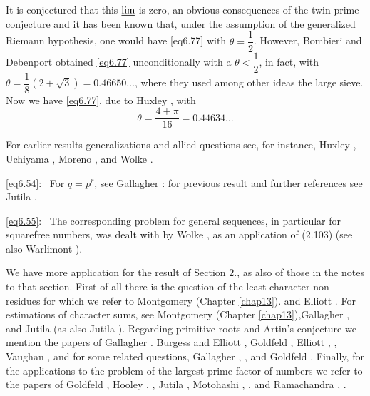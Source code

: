 It is conjectured that this $\varliminf$ is zero, an obvious
consequences of the twin-prime conjecture and it has been known that,
under the assumption of the generalized Riemann hypothesis, one would
have \eqref{eq6.77} with $\theta =\dfrac{1}{2}$. However, Bombieri and
Debenport \cite{key1} obtained \eqref{eq6.77} unconditionally with a $\theta <
\dfrac{1}{2}$, in fact, with $\theta =\dfrac{1}{8}(2 + \sqrt{3}) =
0.46650 \ldots$, where they used among other ideas the large
sieve. Now we have \eqref{eq6.77}, due to Huxley \cite{key10}, with 
\begin{equation*}
\theta = \frac{4 + \pi}{16} = 0.44634 \ldots \tag{6.78}\label{eq6.78} 
\end{equation*} 

For earlier results generalizations and allied questions see, for
instance, Huxley \cite{key2}, Uchiyama \cite{key1}, Moreno
\cite{key1}, and Wolke \cite{key11}. 

\eqref{eq6.54}:~ For $q = p^r$, see Gallagher \cite{key5}: for previous
result and further references see Jutila \cite{key5}. 

\eqref{eq6.55}:~ The corresponding problem for general sequences, in
particular for squarefree numbers, was dealt with by Wolke \cite{key1},
\cite{key2} as an application of (2.103) (see also Warlimont \cite{key2}). 
 
We have more application for the result of Section $\underbar{2}$.,
as also of those in the notes to that section. First of all there is
the question of the least character non-residues for which we refer to
Montgomery \cite{key5} (Chapter \ref{chap13}). and Elliott
\cite{key4}. For estimations of 
character sums, see Montgomery \cite{key5} (Chapter
\ref{chap13}),\pageoriginale Gallagher 
\cite{key4} \cite{key8}, and Jutila \cite{key6} (as also Jutila
\cite{key2}). Regarding 
primitive  roots  and Artin's conjecture we mention the papers of
Gallagher \cite{key1}. Burgess and Elliott \cite{key1},  Goldfeld
\cite{key1}, Elliott \cite{key1}, \cite{key2}, Vaughan \cite{key1}, and 
for some related questions, Gallagher \cite{key1}, \cite{key3}, and Goldfeld
\cite{key2}. Finally, for the applications to the problem of the
largest prime factor of numbers we refer to the papers of Goldfeld
\cite{key2}, Hooley \cite{key2}, \cite{key4},
Jutila \cite{key3}, Motohashi \cite{key3}, \cite{key11}, and
Ramachandra \cite{key1}, \cite{key2}.  
